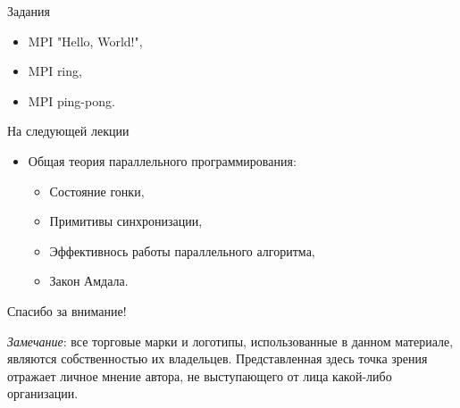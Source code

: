 \begin{frame}{Задания}

\begin{itemize}
    \item MPI "Hello, World!",
    \item MPI ring,
    \item MPI ping-pong.
\end{itemize}

\end{frame}

\begin{frame}{На следующей лекции}

\begin{itemize}
    \item Общая теория параллельного программирования:
    \begin{itemize}
        \item Состояние гонки,
        \item Примитивы синхронизации,
        \item Эффективнось работы параллельного алгоритма,
        \item Закон Амдала.
    \end{itemize}
\end{itemize}

\end{frame}

\begin{frame}

{\huge{Спасибо за внимание!}\par}

\vfill

\tiny{\textit{Замечание}: все торговые марки и логотипы, использованные в данном материале, являются собственностью их владельцев. Представленная здесь точка зрения отражает личное мнение автора, не выступающего от лица какой-либо организации.}

\end{frame}


